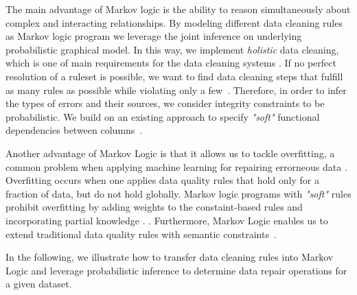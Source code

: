 The main advantage of Markov logic is the ability to reason simultaneously about complex and interacting relationships. By modeling different data cleaning rules as Markov logic program we leverage the joint inference on underlying probabilistic graphical model. In this way, we implement \textit{holistic} data cleaning, which is one of main requirements for the data cleaning systems \cite{fan2013data, Fan:2014:IRM:2628135.2567657, Dallachiesa:2013:NCD:2463676.2465327}. If no perfect resolution of a ruleset is possible, we want to find data cleaning steps that fulfill as many rules as possible while violating only a few~\cite{genesereth1987logical, domingos2009markov}. Therefore, in order to infer the types of errors and their sources, we consider integrity constraints to be probabilistic. We build on an existing approach to specify \textit{"soft"} functional dependencies between columns~\cite{Ilyas:2004:CAD:1007568.1007641}. 

Another advantage of Markov Logic is that it allows us to tackle overfitting, a common problem when applying machine learning for repairing errorneous data . Overfitting occurs when one applies data quality rules that hold only for a fraction of data, but do not hold globally. Markov logic programs with \textit{"soft"} rules prohibit overfitting by adding weights to the constaint-based rules and incorporating partial knowledge \cite{singla2006entity, poon2008joint, lowd2007recursive}. . Furthermore, Markov Logic enables us to extend traditional data quality rules with semantic constraints~\cite{spies2013knowledge}. 



In the following, we illustrate how to transfer data cleaning rules into Markov Logic and leverage probabilistic inference to determine data repair operations for a given dataset.  


